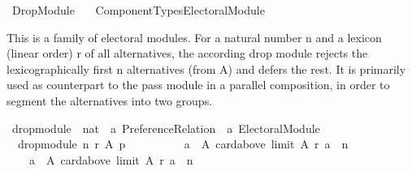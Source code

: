 %
\begin{isabellebody}%
%
%
\isadelimdocument
\isanewline
%
\endisadelimdocument
%
\isatagdocument
\isanewline
\isanewline
%
\isamarkuptrue%
%
\endisatagdocument
{\isafolddocument}%
%
\isadelimdocument
%
\endisadelimdocument
%
\isadelimtheory
%
\endisadelimtheory
%
\isatagtheory
{}\isamarkupfalse%
\ Drop{\isacharunderscore}{\kern0pt}Module\isanewline
\ \ \ {\isachardoublequoteopen}Component{\isacharunderscore}{\kern0pt}Types{\isacharslash}{\kern0pt}Electoral{\isacharunderscore}{\kern0pt}Module{\isachardoublequoteclose}\isanewline
{}%
\endisatagtheory
{\isafoldtheory}%
%
\isadelimtheory
%
\endisadelimtheory
%
\begin{isamarkuptext}%
This is a family of electoral modules. For a natural number n and a
lexicon (linear order) r of all alternatives, the according drop module
rejects the lexicographically first n alternatives (from A) and
defers the rest.
It is primarily used as counterpart to the pass module in a
parallel composition, in order to segment the alternatives into
two groups.%
\end{isamarkuptext}\isamarkuptrue%
%
\isadelimdocument
%
\endisadelimdocument
%
\isatagdocument
%
\isamarkuptrue%
%
\endisatagdocument
{\isafolddocument}%
%
\isadelimdocument
%
\endisadelimdocument
{}\isamarkupfalse%
\ drop{\isacharunderscore}{\kern0pt}module\ {\isacharcolon}{\kern0pt}{\isacharcolon}{\kern0pt}\ {\isachardoublequoteopen}nat\ {\isasymRightarrow}\ {\isacharprime}{\kern0pt}a\ Preference{\isacharunderscore}{\kern0pt}Relation\ {\isasymRightarrow}\ {\isacharprime}{\kern0pt}a\ Electoral{\isacharunderscore}{\kern0pt}Module{\isachardoublequoteclose}\ \isanewline
\ \ {\isachardoublequoteopen}drop{\isacharunderscore}{\kern0pt}module\ n\ r\ A\ p\ {\isacharequal}{\kern0pt}\isanewline
\ \ \ \ {\isacharparenleft}{\kern0pt}{\isacharbraceleft}{\kern0pt}{\isacharbraceright}{\kern0pt}{\isacharcomma}{\kern0pt}\isanewline
\ \ \ \ {\isacharbraceleft}{\kern0pt}a\ {\isasymin}\ A{\isachardot}{\kern0pt}\ card{\isacharparenleft}{\kern0pt}above\ {\isacharparenleft}{\kern0pt}limit\ A\ r{\isacharparenright}{\kern0pt}\ a{\isacharparenright}{\kern0pt}\ {\isasymle}\ n{\isacharbraceright}{\kern0pt}{\isacharcomma}{\kern0pt}\isanewline
\ \ \ \ {\isacharbraceleft}{\kern0pt}a\ {\isasymin}\ A{\isachardot}{\kern0pt}\ card{\isacharparenleft}{\kern0pt}above\ {\isacharparenleft}{\kern0pt}limit\ A\ r{\isacharparenright}{\kern0pt}\ a{\isacharparenright}{\kern0pt}\ {\isachargreater}{\kern0pt}\ n{\isacharbraceright}{\kern0pt}{\isacharparenright}{\kern0pt}{\isachardoublequoteclose}%

\end{isabellebody}
